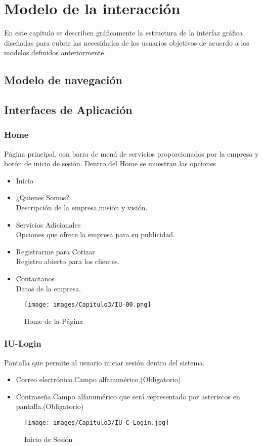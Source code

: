 \chapter{Modelo de la interacción}	
\label{cap:ModeloDeLaInteraccion}
    En este capítulo se describen gráficamente la estructura de la interfaz gráfica diseñadas para cubrir las necesidades de los usuarios objetivos de acuerdo a los modelos definidos anteriormente.
\section{Modelo de navegación}
\clearpage
\section{Interfaces de Aplicación}

\subsection{Home}
\hypertarget{IU:IU-HOME}{}
    Página principal, con barra de menú de servicios proporcionados por la empresa y botón de inicio de sesión.
Dentro del Home se muestran las opciones
\begin{itemize}
    \item Inicio
    \item ¿Quienes Somos?
         \\Descripción de la empresa,misión y visión.
    \item Servicios Adicionales
         \\Opciones que ofrece la empresa para su publicidad.
    \item Registrarme para Cotizar
         \\Registro abierto para los clientes.
    \item Contactanos
        \\Datos de la empresa.
\end{itemize}
\begin{figure}[htbp!]
    \centering
    \texttt{[image: images/Capitulo3/IU-00.png]}
    \caption{Home de la Página}
    \label{fig:my_label}
\end{figure}
\clearpage

\hypertarget{IU:IU-Login}{}
\subsection{IU-Login}
    Pantalla que permite al usuario iniciar sesión dentro del sistema.
\begin{itemize}
    \item Correo electrónico.Campo alfanumérico.(Obligatorio)
    \item Contraseña.Campo alfanumérico que será representado por asteriscos en pantalla.(Obligatorio)
\end{itemize}
\begin{figure}[htbp!]
    \texttt{[image: images/Capitulo3/IU-C-Login.jpg]}
    \caption{Inicio de Sesión}
    \label{fig:my_label}
\end{figure}
\clearpage

